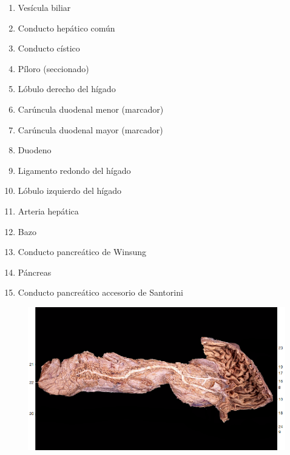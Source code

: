 \begin{enumerate}
    \item Vesícula biliar
    \item Conducto hepático común
    \item Conducto cístico
    \item Píloro (seccionado)
    \item Lóbulo derecho del hígado
    \item Carúncula duodenal menor (marcador)
    \item Carúncula duodenal mayor (marcador)
    \item Duodeno
    \item Ligamento redondo del hígado
    \item Lóbulo izquierdo del hígado
    \item Arteria hepática
    \item Bazo
    \item Conducto pancreático de Winsung
    \item Páncreas
    \item Conducto pancreático accesorio de Santorini    
\end{enumerate}
\begin{figure}[H]
	\begin{center}
 		\includegraphics[width = .7\textwidth]{v2/images/image7.png}
	\end{center} 
\end{figure}
